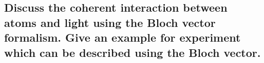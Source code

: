 \subsection{Discuss the coherent interaction between atoms and light using the Bloch vector formalism. Give an example for experiment which can be described using the Bloch vector.}



